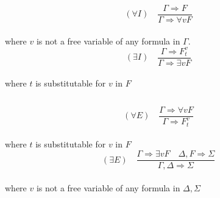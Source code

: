 \begin{center}
\begin{minipage}[t]{0.3\textwidth}
\begin{equation*}
(\forall I) \quad \frac{ \Gamma \Rightarrow F}{\Gamma \Rightarrow \forall v F }
\end{equation*} \\
where $v$ is not a free variable of any formula in $\Gamma$. \\
\begin{equation*}
(\exists I) \quad \frac{ \Gamma \Rightarrow F_t^v}{\Gamma \Rightarrow \exists v F}
\end{equation*}\\
where $t$ is substitutable for $v$ in $F$
\end{minipage}
\begin{minipage}[t]{0.1\textwidth}
$\quad$
\end{minipage}
\begin{minipage}[t]{0.3\textwidth}
\begin{equation*}
(\forall E) \quad \frac{ \Gamma \Rightarrow \forall vF }{\Gamma \Rightarrow F_t^v}
\end{equation*} \\
where $t$ is substitutable for $v$ in $F$ \\
\begin{equation*}
(\exists E) \quad \frac{ \Gamma \Rightarrow \exists vF \quad \Delta, F \Rightarrow \Sigma }
{\Gamma , \Delta \Rightarrow \Sigma}
\end{equation*} \\
where $v$ is not a free variable of any formula in $\Delta, \Sigma$
\end{minipage}
\end{center}
